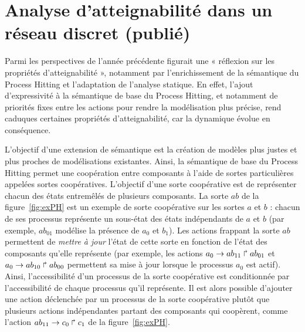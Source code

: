 \section{Analyse d'atteignabilité dans un réseau discret \normalsize(publié)}
\label{sec:cs2bio}

Parmi les perspectives de l'année précédente figurait une « réflexion sur les propriétés d'atteignabilité », notamment par l'enrichissement de la sémantique du Process Hitting et l'adaptation de l'analyse statique.
En effet, l'ajout d'expressivité à la sémantique de base du Process Hitting, et notamment de priorités fixes entre les actions pour rendre la modélisation plus précise, rend caduques certaines propriétés d'atteignabilité, car la dynamique évolue en conséquence.

L'objectif d'une extension de sémantique est la création de modèles plus justes et plus proches de modélisations existantes.
Ainsi, la sémantique de base du Process Hitting permet une coopération entre composants à l'aide de sortes particulières appelées sortes coopératives.
L'objectif d'une sorte coopérative est de représenter chacun des états entremêlés de plusieurs composants.
La sorte $ab$ de la figure~\ref{fig:exPH} est un exemple de sorte coopérative sur les sortes $a$ et $b$ : chacun de ses processus représente un sous-état des états indépendants de $a$ et $b$ (par exemple, $ab_{01}$ modélise la présence de $a_0$ et $b_1$).
Les actions frappant la sorte $ab$ permettent de \emph{mettre à jour} l'état de cette sorte en fonction de l'état des composants qu'elle représente
(par exemple, les actions $a_0\rightarrow ab_{11}\Rsh ab_{01}$ et $a_0\rightarrow ab_{10}\Rsh ab_{00}$ permettent sa mise à jour lorsque le processus $a_0$ est actif).
Ainsi, l'accessibilité d'un processus de la sorte coopérative est conditionnée par l'accessibilité de chaque processus qu'il représente.
Il est alors possible d'ajouter une action déclenchée par un processus de la sorte coopérative plutôt que plusieurs actions indépendantes partant des composants qui coopèrent, comme l'action $ab_{11}\rightarrow c_0\Rsh c_1$ de la figure~\ref{fig:exPH}.

